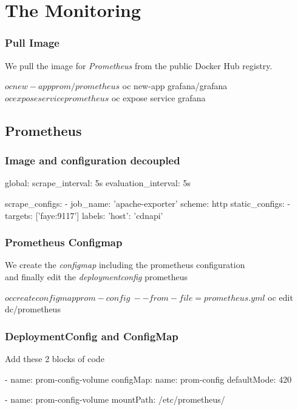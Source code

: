 
\section{The Monitoring}

\begin{frame}[fragile]
  \frametitle{Pull Image}
  We pull the image for \emph{Prometheus} from the public Docker Hub registry.
  \begin{bashcode}
    $ oc new-app prom/prometheus
    $ oc new-app grafana/grafana
    $ oc expose service prometheus
    $ oc expose service grafana
  \end{bashcode}
\end{frame}

\subsection{Prometheus}

\begin{frame}[fragile]
  \frametitle{Image and configuration decoupled}
  \begin{yamlcode}
    global:
      scrape_interval:     5s 
      evaluation_interval: 5s 

    scrape_configs:
      - job_name: 'apache-exporter'
        scheme: http
        static_configs:
        - targets: ['faye:9117']
          labels: {'host': 'cdnapi'}

  \end{yamlcode}
\end{frame}

\begin{frame}[fragile]
  \frametitle{Prometheus Configmap}
  We create the \emph{configmap} including the prometheus configuration \\
  and finally edit the \emph{deploymentconfig} prometheus
  \begin{bashcode}
    $ oc create configmap prom-config \
    --from-file=prometheus.yml
    $ oc edit dc/prometheus
  \end{bashcode}
\end{frame}

\begin{frame}[fragile]
  \frametitle{DeploymentConfig and ConfigMap}
  Add these 2 blocks of code
  \begin{yamlcode}
    - name: prom-config-volume
      configMap:
        name: prom-config
        defaultMode: 420
  \end{yamlcode}

  \begin{yamlcode}
    - name: prom-config-volume
      mountPath: /etc/prometheus/
  \end{yamlcode}
\end{frame}
  

